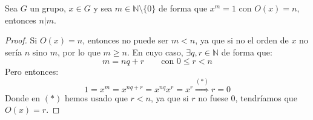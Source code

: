 \begin{prop}\label{prop:divide_orden}
    Sea $G$ un grupo, $x\in G$ y sea $m\in \mathbb{N}\setminus\{0\}$ de forma que $x^m = 1$ con $O(x)=n$, entonces $n|m$.
    \begin{proof}
        Si $O(x)=n$, entonces no puede ser $m<n$, ya que si no el orden de $x$ no sería $n$ sino $m$, por lo que $m\geq n$. En cuyo caso, $\exists q,r\in \mathbb{N}$ de forma que:
        \begin{equation*}
            m = nq + r \qquad \text{con\ }0\leq r < n 
        \end{equation*}
        Pero entonces:
        \begin{equation*}
            1 = x^m = x^{nq+r} = x^{nq} x^r = x^r \stackrel{(\ast)}{\Longrightarrow} r = 0
        \end{equation*}
        Donde en $(\ast)$ hemos usado que $r<n$, ya que si $r$ no fuese $0$, tendríamos que $O(x)=r$.
    \end{proof}
\end{prop}

